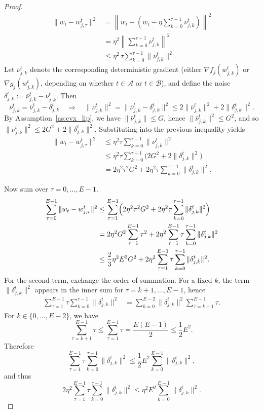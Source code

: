 \documentclass[10pt,a4paper]{amsart}
\begin{document}
\begin{proof}
\begin{align*}
    \|w_t - w_{j,\tau}^t\|^2
    &= \left\|w_t -\left(w_t - \eta \sum_{k=0}^{\tau-1}\nu_{j,k}^t\right)\right\|^2
    \\
    &= \eta^2\left\|\sum_{k=0}^{\tau-1}\nu_{j,k}^t\right\|^2
    \\
    &\leq \eta^2 \,\tau \sum_{k=0}^{\tau-1}\|\nu_{j,k}^t\|^2.
\end{align*}
Let $\bar{\nu}_{j,k}^t$ denote the corresponding {deterministic} gradient
(either $\nabla f_j(w_{j,k}^t)$ or $\nabla g_j(w_{j,k}^t)$, depending on whether $t \in \mathcal{A}$ or $t \in \mathcal{B}$), and define the noise
$
\delta_{j,k}^t := \bar{\nu}_{j,k}^t - \nu_{j,k}^t.
$
Then
\[
\nu_{j,k}^t = \bar{\nu}_{j,k}^t - \delta_{j,k}^t
\quad\Rightarrow\quad
\|\nu_{j,k}^t\|^2
= \|\bar{\nu}_{j,k}^t - \delta_{j,k}^t\|^2
\le 2\|\bar{\nu}_{j,k}^t\|^2 + 2\|\delta_{j,k}^t\|^2.
\]
By Assumption~\ref{as:cvx_lip}, we have
$\|\bar{\nu}_{j,k}^t\|\le G$, hence $\|\bar{\nu}_{j,k}^t\|^2 \le G^2$, and so
$
\|\nu_{j,k}^t\|^2 \le 2G^2 + 2\|\delta_{j,k}^t\|^2.
$
Substituting into the previous inequality yields
\begin{align*}
    \|w_t - w_{j,\tau}^t\|^2
    &\le \eta^2 \tau \sum_{k=0}^{\tau-1}\|\nu_{j,k}^t\|^2
    \\
    &\le \eta^2 \tau \sum_{k=0}^{\tau-1}
        \bigl(2G^2 + 2\|\delta_{j,k}^t\|^2\bigr)
    \\
    &= 2\eta^2 \tau^2 G^2
       + 2 \eta^2 \tau\sum_{k=0}^{\tau-1}\|\delta_{j,k}^t\|^2.
\end{align*}

Now sum over $\tau=0,\dots,E-1$.
\begin{align*}
    \sum_{\tau=0}^{E-1} \|w_t - w_{j,\tau}^t\|^2
    &\le
    \sum_{\tau=1}^{E-1}\Bigl(2\eta^2 \tau^2 G^2
       + 2 \eta^2 \tau\sum_{k=0}^{\tau-1}\|\delta_{j,k}^t\|^2\Bigr)
    \\
    &= 2\eta^2 G^2 \sum_{\tau=1}^{E-1} \tau^2
       + 2\eta^2 \sum_{\tau=1}^{E-1} \tau \sum_{k=0}^{\tau-1}\|\delta_{j,k}^t\|^2
    \\
    & \leq \frac{2}{3}\eta^2 E^3 G^2 + 2\eta^2 \sum_{\tau=1}^{E-1} \tau \sum_{k=0}^{\tau-1}\|\delta_{j,k}^t\|^2.
\end{align*}
For the second term, exchange the order of summation. For a fixed $k$, the term
$\|\delta_{j,k}^t\|^2$ appears in the inner sum for $\tau = k+1,\dots,E-1$, hence
\begin{align*}
    \sum_{\tau=1}^{E-1} \tau \sum_{k=0}^{\tau-1}\|\delta_{j,k}^t\|^2
    &= \sum_{k=0}^{E-2} \|\delta_{j,k}^t\|^2 \sum_{\tau=k+1}^{E-1} \tau.
\end{align*}
For $k \in \{0,\dots,E-2\}$, we have
\[
\sum_{\tau=k+1}^{E-1} \tau
\le \sum_{\tau=1}^{E-1} \tau
= \frac{E(E-1)}{2}
\le \frac{1}{2} E^2.
\]
Therefore
\[
\sum_{\tau=1}^{E-1} \tau \sum_{k=0}^{\tau-1}\|\delta_{j,k}^t\|^2
\le \frac{1}{2} E^2 \sum_{k=0}^{E-1}\|\delta_{j,k}^t\|^2,
\]
and thus
\[
2\eta^2 \sum_{\tau=1}^{E-1} \tau \sum_{k=0}^{\tau-1}\|\delta_{j,k}^t\|^2
\le \eta^2 E^2 \sum_{k=0}^{E-1}\|\delta_{j,k}^t\|^2.
\]


\end{proof}
\end{document}
